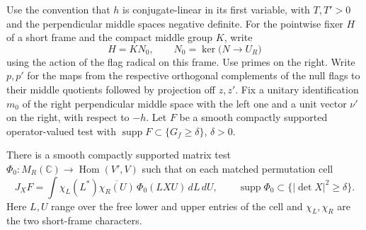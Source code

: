 \begin{auxlemma}\label{lem:oriented-terminal-fibre}
Use the convention that \(h\) is conjugate-linear in its first variable,
with \(T,T'>0\) and the perpendicular middle spaces negative definite.
For the pointwise fixer \(H\) of a short frame and the compact middle group \(K\), write
\[
 H=K N_0,\qquad N_0=\ker\bigl(N\longrightarrow U_R\bigr)
\]
using the action of the flag radical on this frame. Use primes on the right. Write \(p,p'\) for the maps from
the respective orthogonal complements of the null flags to their
middle quotients followed by projection off \(z,z'\). Fix a unitary
identification \(m_0\) of the right perpendicular middle space with
the left one and a unit vector \(\nu'\) on the right, with respect to
\(-h\). Let \(F\) be a smooth compactly supported operator-valued test with
\(\operatorname{supp}F\subset\{G_f\ge\delta\}\), \(\delta>0\).

There is a smooth compactly supported matrix test
\(\Phi_0:M_R(\mathbb C)\longrightarrow\operatorname{Hom}(V',V)\)
such that on each matched permutation cell
\[
 J_XF=\int\chi_L(L^*)\overline{\chi_R(U)}\,
             \Phi_0(LXU)\,dL\,dU,\qquad
 \operatorname{supp}\Phi_0\subset\{|\det X|^2\ge\delta\}.
\]
Here \(L,U\) range over the free lower and upper entries of the cell
and \(\chi_L,\chi_R\) are the two short-frame characters.
\end{auxlemma}

